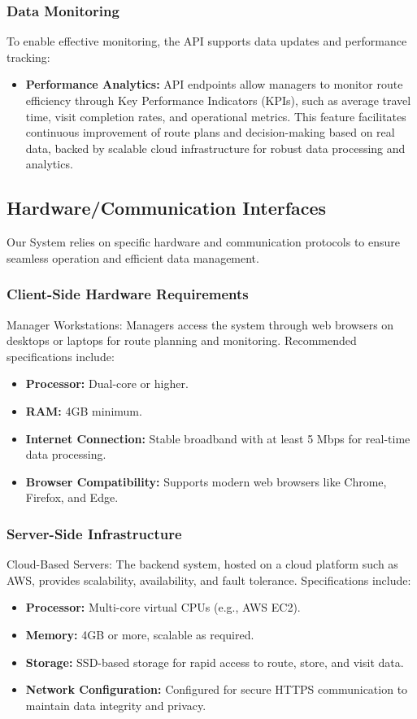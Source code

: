 \subsubsection{Data Monitoring}
To enable effective monitoring, the API supports data updates and performance tracking:
\begin{itemize}
    \item \textbf{Performance Analytics:} API endpoints allow managers to monitor route efficiency through Key Performance Indicators (KPIs), such as average travel time, visit completion rates, and operational metrics. This feature facilitates continuous improvement of route plans and decision-making based on real data, backed by scalable cloud infrastructure for robust data processing and analytics.
\end{itemize}


\subsection{Hardware/Communication Interfaces}
Our System relies on specific hardware and communication protocols to ensure seamless operation and efficient data management.

\subsubsection{Client-Side Hardware Requirements}
Manager Workstations: Managers access the system through web browsers on desktops or laptops for route planning and monitoring. Recommended specifications include:
\begin{itemize}
    \item \textbf{Processor:} Dual-core or higher.
    \item \textbf{RAM:} 4GB minimum.
    \item \textbf{Internet Connection:} Stable broadband with at least 5 Mbps for real-time data processing.
    \item \textbf{Browser Compatibility:} Supports modern web browsers like Chrome, Firefox, and Edge.
\end{itemize}

\subsubsection{Server-Side Infrastructure}
Cloud-Based Servers: The backend system, hosted on a cloud platform such as AWS, provides scalability, availability, and fault tolerance. Specifications include:
\begin{itemize}
    \item \textbf{Processor:} Multi-core virtual CPUs (e.g., AWS EC2).
    \item \textbf{Memory:} 4GB or more, scalable as required.
    \item \textbf{Storage:} SSD-based storage for rapid access to route, store, and visit data.
    \item \textbf{Network Configuration:} Configured for secure HTTPS communication to maintain data integrity and privacy.
\end{itemize}

